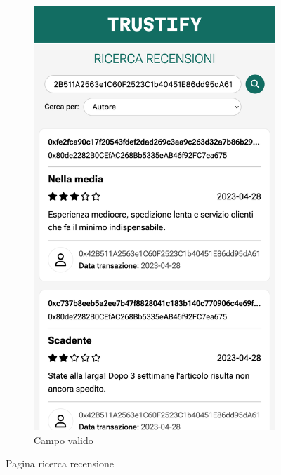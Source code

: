 \begin{figure}[H]
\begin{subfigure}[t]{0.49\textwidth}
    \includegraphics[width=0.7\linewidth]{src/img/ricerca_recensioni_valid.png}
    \caption{Campo valido}\label{fig:ricerca_recensioni_valid}
    \end{subfigure}

    \caption{Pagina ricerca recensione}\label{fig:ricerca_recensioni}
\end{figure}
\pagebreak